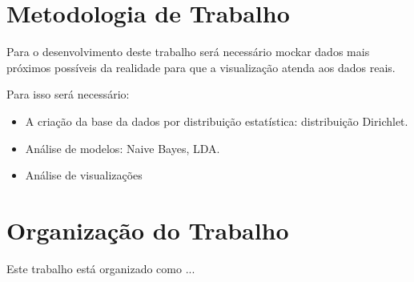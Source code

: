 \section{Metodologia de Trabalho}

Para o desenvolvimento deste trabalho será necessário mockar dados mais próximos possíveis da realidade para que a visualização atenda aos dados reais.

Para isso será necessário:
\begin{itemize}
	\item A criação da base da dados por distribuição estatística: distribuição Dirichlet.
	\item Análise de modelos: Naive Bayes, LDA.
	\item Análise de visualizações
\end{itemize}

\section{Organização do Trabalho}

Este trabalho está organizado como ...

